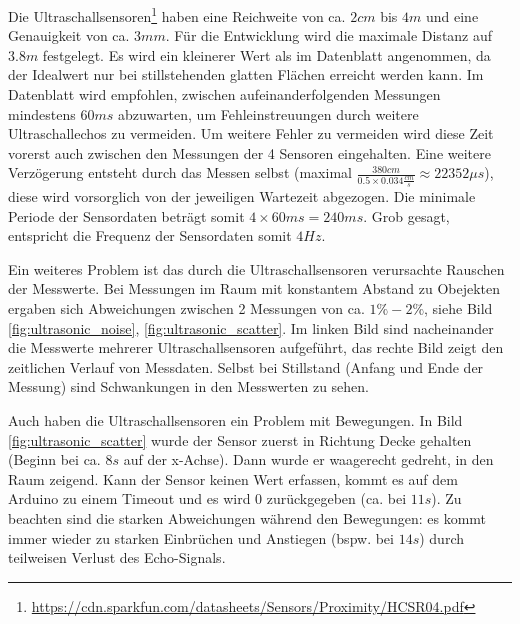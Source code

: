 Die Ultraschallsensoren\footnote{\url{https://cdn.sparkfun.com/datasheets/Sensors/Proximity/HCSR04.pdf}} haben eine Reichweite von ca. $2cm$ bis $4m$ und eine Genauigkeit von ca. $3mm$. Für die Entwicklung wird die maximale Distanz auf $3.8m$ festgelegt. Es wird ein kleinerer Wert als im Datenblatt angenommen, da der Idealwert nur bei stillstehenden glatten Flächen erreicht werden kann. Im Datenblatt wird empfohlen, zwischen aufeinanderfolgenden Messungen mindestens $60ms$ abzuwarten, um Fehleinstreuungen durch weitere Ultraschallechos zu vermeiden. Um weitere Fehler zu vermeiden wird diese Zeit vorerst auch zwischen den Messungen der 4 Sensoren eingehalten. Eine weitere Verzögerung entsteht durch das Messen selbst (maximal $\frac{380cm}{0.5 \times 0.034\frac{cm}{s}}\approx 22352\mu s$), diese wird vorsorglich von der jeweiligen Wartezeit abgezogen. Die minimale Periode der Sensordaten beträgt somit $4 \times 60ms=240ms$. Grob gesagt, entspricht die Frequenz der Sensordaten somit $4Hz$.

Ein weiteres Problem ist das durch die Ultraschallsensoren verursachte Rauschen der Messwerte. Bei Messungen im Raum mit konstantem Abstand zu Obejekten ergaben sich Abweichungen zwischen 2 Messungen von ca. $1\%-2\%$, siehe Bild \ref{fig:ultrasonic_noise}, \ref{fig:ultrasonic_scatter}. Im linken Bild sind nacheinander die Messwerte mehrerer Ultraschallsensoren aufgeführt, das rechte Bild zeigt den zeitlichen Verlauf von Messdaten. Selbst bei Stillstand (Anfang und Ende der Messung) sind Schwankungen in den Messwerten zu sehen.

Auch haben die Ultraschallsensoren ein Problem mit Bewegungen. In Bild \ref{fig:ultrasonic_scatter} wurde der Sensor zuerst in Richtung Decke gehalten (Beginn bei ca. $8s$ auf der x-Achse). Dann wurde er waagerecht gedreht, in den Raum zeigend. Kann der Sensor keinen Wert erfassen, kommt es auf dem Arduino zu einem Timeout und es wird $0$ zurückgegeben (ca. bei $11s$). Zu beachten sind die starken Abweichungen während den Bewegungen: es kommt immer wieder zu starken Einbrüchen und Anstiegen (bspw. bei $14s$) durch teilweisen Verlust des Echo-Signals.

